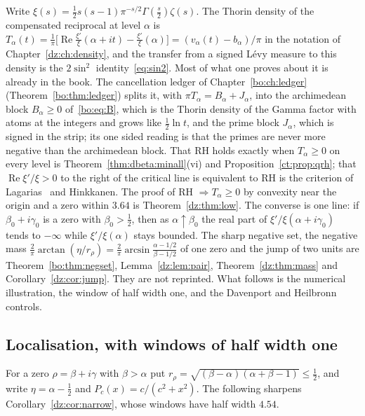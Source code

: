 Write $\xi(s)=\frac12s(s-1)\pi^{-s/2}\Gamma(\frac s2)\zeta(s)$. The Thorin density of the compensated reciprocal at level $\alpha$ is $T_\alpha(t)=\frac1\pi\big[\operatorname{Re}\frac{\xi'}\xi(\alpha+it)-\frac{\xi'}\xi(\alpha)\big]=(v_\alpha(t)-b_\alpha)/\pi$ in the notation of Chapter~\ref{dz:ch:density}, and the transfer from a signed L\'evy measure to this density is the $2\sin^2$ identity~\eqref{eq:sin2}. Most of what one proves about it is already in the book. The cancellation ledger of Chapter~\ref{bo:ch:ledger} (Theorem~\ref{bo:thm:ledger}) splits it, with $\pi T_\alpha=B_\alpha+J_\alpha$, into the archimedean block $B_\alpha\ge0$ of~\eqref{bo:eq:B}, which is the Thorin density of the Gamma factor with atoms at the integers and grows like $\frac12\ln t$, and the prime block $J_\alpha$, which is signed in the strip; its one sided reading is that the primes are never more negative than the archimedean block. That RH holds exactly when $T_\alpha\ge0$ on every level is Theorem~\ref{thm:dbeta:minall}(vi) and Proposition~\ref{ct:prop:qrh}; that $\operatorname{Re}\xi'/\xi>0$ to the right of the critical line is equivalent to RH is the criterion of Lagarias~\cite{Lagarias} and Hinkkanen. The proof of RH $\Rightarrow T_\alpha\ge0$ by convexity near the origin and a zero within $3.64$ is Theorem~\ref{dz:thm:low}. The converse is one line: if $\beta_0+i\gamma_0$ is a zero with $\beta_0>\frac12$, then as $\alpha\uparrow\beta_0$ the real part of $\xi'/\xi(\alpha+i\gamma_0)$ tends to $-\infty$ while $\xi'/\xi(\alpha)$ stays bounded. The sharp negative set, the negative mass $\frac2\pi\arctan(\eta/r_\rho)=\frac2\pi\arcsin\frac{\alpha-1/2}{\beta-1/2}$ of one zero and the jump of two units are Theorem~\ref{bo:thm:negset}, Lemma~\ref{dz:lem:pair}, Theorem~\ref{dz:thm:mass} and Corollary~\ref{dz:cor:jump}. They are not reprinted. What follows is the numerical illustration, the window of half width one, and the Davenport and Heilbronn controls.

\subsection{Localisation, with windows of half width one}
For a zero $\rho=\beta+i\gamma$ with $\beta>\alpha$ put $r_\rho=\sqrt{(\beta-\alpha)(\alpha+\beta-1)}\le\frac12$, and write $\eta=\alpha-\frac12$ and $P_c(x)=c/(c^2+x^2)$. The following sharpens Corollary~\ref{dz:cor:narrow}, whose windows have half width $4.54$.

